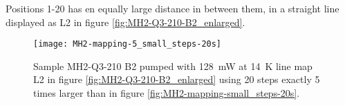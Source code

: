 Positions 1-20 has en equally large distance in between them, in a straight line displayed as L2 in figure \ref{fig:MH2-Q3-210-B2_enlarged}.


\begin{figure}[H]
\centering
\texttt{[image: MH2-mapping-5\_small\_steps-20s]}
\caption[MH2-Q3-210 line mapping]{Sample MH2-Q3-210 B2 pumped with 128~mW at 14~K line map L2 in figure \ref{fig:MH2-Q3-210-B2_enlarged} using 20 steps exactly 5 times larger than in figure \ref{fig:MH2-mapping-small_steps-20s}.}
\label{fig:MH2-mapping-5_small_steps-20s}%
\end{figure}


